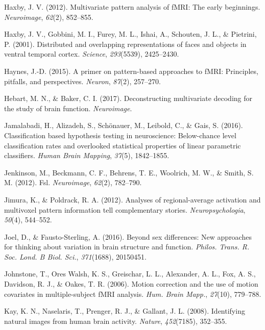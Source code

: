 \documentclass[12pt,american,a4paper,oneside,]{memoir} %
\begin{document}
\leavevmode\hypertarget{ref-Haxby2012-sd}{}%
Haxby, J. V. (2012). Multivariate pattern analysis of fMRI: The early beginnings. \emph{Neuroimage}, \emph{62}(2), 852--855.

\leavevmode\hypertarget{ref-Haxby2001-os}{}%
Haxby, J. V., Gobbini, M. I., Furey, M. L., Ishai, A., Schouten, J. L., \& Pietrini, P. (2001). Distributed and overlapping representations of faces and objects in ventral temporal cortex. \emph{Science}, \emph{293}(5539), 2425--2430.

\leavevmode\hypertarget{ref-haynes2015primer}{}%
Haynes, J.-D. (2015). A primer on pattern-based approaches to fMRI: Principles, pitfalls, and perspectives. \emph{Neuron}, \emph{87}(2), 257--270.

\leavevmode\hypertarget{ref-Hebart2017-jn}{}%
Hebart, M. N., \& Baker, C. I. (2017). Deconstructing multivariate decoding for the study of brain function. \emph{Neuroimage}.

\leavevmode\hypertarget{ref-jamalabadi2016classification}{}%
Jamalabadi, H., Alizadeh, S., Schönauer, M., Leibold, C., \& Gais, S. (2016). Classification based hypothesis testing in neuroscience: Below-chance level classification rates and overlooked statistical properties of linear parametric classifiers. \emph{Human Brain Mapping}, \emph{37}(5), 1842--1855.

\leavevmode\hypertarget{ref-jenkinson2012fsl}{}%
Jenkinson, M., Beckmann, C. F., Behrens, T. E., Woolrich, M. W., \& Smith, S. M. (2012). Fsl. \emph{Neuroimage}, \emph{62}(2), 782--790.

\leavevmode\hypertarget{ref-Jimura2012-lv}{}%
Jimura, K., \& Poldrack, R. A. (2012). Analyses of regional-average activation and multivoxel pattern information tell complementary stories. \emph{Neuropsychologia}, \emph{50}(4), 544--552.

\leavevmode\hypertarget{ref-Joel2016-uo}{}%
Joel, D., \& Fausto-Sterling, A. (2016). Beyond sex differences: New approaches for thinking about variation in brain structure and function. \emph{Philos. Trans. R. Soc. Lond. B Biol. Sci.}, \emph{371}(1688), 20150451.

\leavevmode\hypertarget{ref-Johnstone2006-tn}{}%
Johnstone, T., Ores Walsh, K. S., Greischar, L. L., Alexander, A. L., Fox, A. S., Davidson, R. J., \& Oakes, T. R. (2006). Motion correction and the use of motion covariates in multiple-subject fMRI analysis. \emph{Hum. Brain Mapp.}, \emph{27}(10), 779--788.

\leavevmode\hypertarget{ref-kay2008identifying}{}%
Kay, K. N., Naselaris, T., Prenger, R. J., \& Gallant, J. L. (2008). Identifying natural images from human brain activity. \emph{Nature}, \emph{452}(7185), 352--355.
\end{document}
